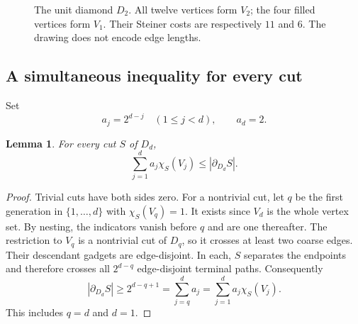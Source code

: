 \documentclass[11pt]{article}
\newtheorem{lemma}[theorem]{Lemma}
\newcommand{\cut}{\chi}
\begin{document}
\begin{figure}[tb]
\centering
{}
\caption{The unit diamond $D_2$. All twelve vertices form $V_2$; the four
filled vertices form $V_1$. Their Steiner costs are respectively $11$ and $6$.
The drawing does not encode edge lengths.}
\label{fig:diamond}
\end{figure}

\subsection{A simultaneous inequality for every cut}
Set
\[
a_j=2^{d-j}\quad(1\le j<d),\qquad a_d=2.
\]
\begin{lemma}\label{lem:cut}
For every cut $S$ of $D_d$,
\begin{equation}\label{eq:cut}
\sum_{j=1}^d a_j\cut_S(V_j)\le |\partial_{D_d}S|.
\end{equation}
\end{lemma}
\begin{proof}
Trivial cuts have both sides zero. For a nontrivial cut, let $q$ be the first
generation in $\{1,\ldots,d\}$ with $\cut_S(V_q)=1$. It exists since $V_d$
is the whole vertex set. By nesting, the indicators vanish before $q$ and
are one thereafter. The restriction to $V_q$ is a nontrivial cut of $D_q$,
so it crosses at least two coarse edges. Their descendant gadgets are
edge-disjoint. In each, $S$ separates the endpoints and therefore crosses
all $2^{d-q}$ edge-disjoint terminal paths. Consequently
\[
|\partial_{D_d}S|\ge2^{d-q+1}=\sum_{j=q}^d a_j
=\sum_{j=1}^d a_j\cut_S(V_j).
\]
This includes $q=d$ and $d=1$.
\end{proof}
\end{document}
